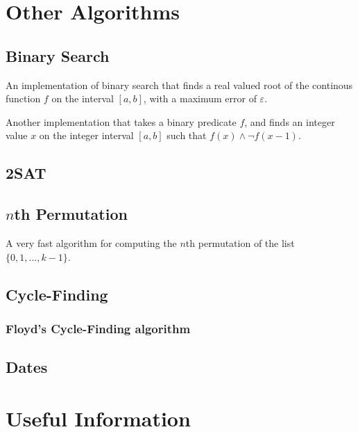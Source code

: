 \documentclass[8pt,a4paper]{amsart}
\begin{document}
\section{Other Algorithms}
\subsection{Binary Search}
An implementation of binary search that finds a real valued root of the
continous function $f$ on the interval $[a,b]$, with a maximum error of
$\varepsilon$.


Another implementation that takes a binary predicate $f$, and finds an integer
value $x$ on the integer interval $[a,b]$ such that $f(x) \land \lnot f(x -
1)$.


\subsection{2SAT}


\subsection{$n$th Permutation}
A very fast algorithm for computing the $n$th permutation of the list
$\{0,1,\ldots,k-1\}$.


\subsection{Cycle-Finding}
\subsubsection{Floyd's Cycle-Finding algorithm}


\subsection{Dates}


\section{Useful Information}
\end{document}
